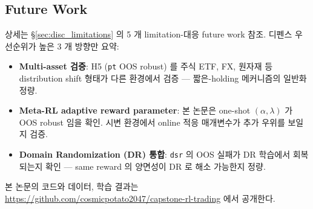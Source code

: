 \documentclass[11pt, a4paper]{article}
\begin{document}
\subsection*{Future Work}

상세는 \S\ref{sec:disc_limitations} 의 5 개 limitation-대응 future work 참조.
디펜스 우선순위가 높은 3 개 방향만 요약:
\begin{itemize}[leftmargin=*]
\item \textbf{Multi-asset 검증}: H5 (\texttt{pt} OOS robust) 를 주식 ETF, FX,
원자재 등 distribution shift 형태가 다른 환경에서 검증 — 짧은-holding 메커니즘의
일반화 정량.
\item \textbf{Meta-RL adaptive reward parameter}: 본 논문은 one-shot
$(\alpha, \lambda)$ 가 OOS robust 임을 확인. 시변 환경에서 online 적응 매개변수가
추가 우위를 보일지 검증.
\item \textbf{Domain Randomization (DR) 통합}: \texttt{dsr} 의 OOS 실패가 DR
학습에서 회복되는지 확인 — same reward 의 양면성이 DR 로 해소 가능한지 정량.
\end{itemize}

본 논문의 코드와 데이터, 학습 결과는
\url{https://github.com/cosmicpotato2047/capstone-rl-trading} 에서 공개한다.

\clearpage


\end{document}

